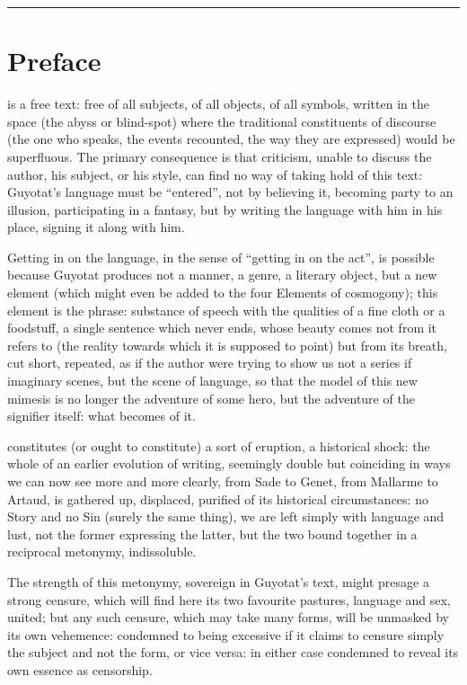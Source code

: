 \documentclass[10pt,twoside]{memoir}
\begin{document}
\plainbreak{2}


\chapter{Preface}

 is a free text: free of all subjects, of all objects, of all symbols,
written in the space (the abyss or blind-spot) where the traditional constituents of discourse (the
one who speaks, the events recounted, the way they are expressed) would be superfluous. The primary
consequence is that criticism, unable to discuss the author, his subject, or his style, can find no
way of taking hold of this text: Guyotat's language must be \enquote{entered}, not by believing it,
becoming party to an illusion, participating in a fantasy, but by writing the language with him in
his place, signing it along with him.

Getting in on the language, in the sense of \enquote{getting in on the act}, is possible because
Guyotat produces not a manner, a genre, a literary object, but a new element (which might even be
added to the four Elements of cosmogony); this element is the phrase: substance of speech with the
qualities of a fine cloth or a foodstuff, a single sentence which never ends, whose beauty comes not
from it refers to (the reality towards which it is supposed to point) but from its breath, cut
short, repeated, as if the author were trying to show us not a series if imaginary scenes, but the
scene of language, so that the model of this new mimesis is no longer the adventure of some hero,
but the adventure of the signifier itself: what becomes of it.

 constitutes (or ought to constitute) a sort of eruption, a historical
shock: the whole of an earlier evolution of writing, seemingly double but coinciding in ways we can
now see more and more clearly, from Sade to Genet, from Mallarme to Artaud, is gathered up,
displaced, purified of its historical circumstances: no Story and no Sin (surely the same thing), we
are left simply with language and lust, not the former expressing the latter, but the two bound
together in a reciprocal metonymy, indissoluble.

The strength of this metonymy, sovereign in Guyotat's text, might presage a strong censure, which
will find here its two favourite pastures, language and sex, united; but any such censure, which may
take many forms, will be unmasked by its own vehemence: condemned to being excessive if it claims to
censure simply the subject and not the form, or vice versa: in either case condemned to reveal its
own essence as censorship.
\end{document}

